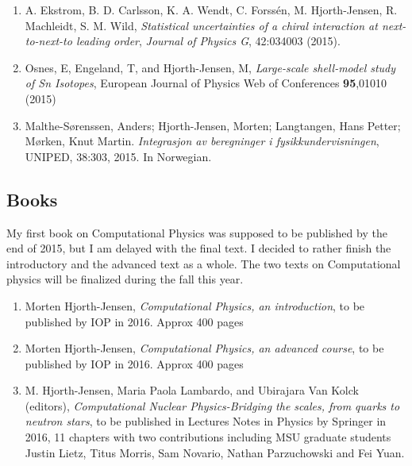\documentclass[prc,amsart,english,twocolumn,superscriptaddress,showpacs,floatfix]{revtex4}
\begin{document}
\begin{enumerate}
\item A. Ekstrom, B. D. Carlsson, K. A. Wendt, C. Forssén, M. Hjorth-Jensen, R. Machleidt, S. M. Wild,  \emph{Statistical uncertainties of a chiral interaction at next-to-next-to leading order},   \emph{Journal of Physics G}, 42:034003 (2015).



\item Osnes, E, Engeland, T, and Hjorth-Jensen, M, \emph{Large-scale shell-model study of Sn Isotopes}, European Journal of Physics Web of Conferences \textbf{95},01010 (2015)

\item Malthe-S\o renssen, Anders; Hjorth-Jensen, Morten; Langtangen, Hans Petter; M\o rken, Knut Martin. \emph{Integrasjon av beregninger i fysikkundervisningen}, UNIPED, 38:303, 2015. In Norwegian.
 \end{enumerate}


 \subsection*{Books}
My first book on Computational Physics was supposed to be published by the end of 2015, but I am delayed with the final text. I decided to rather finish the introductory and the advanced text as a whole. The two texts on Computational physics will be finalized during the fall this year. 
\begin{enumerate}
\item Morten Hjorth-Jensen, \emph{Computational Physics, an introduction}, to be published by IOP in 2016. Approx 400 pages

\item Morten Hjorth-Jensen, \emph{Computational Physics, an advanced course}, to be published by IOP in 2016. Approx 400 pages


\item M. Hjorth-Jensen, Maria Paola Lambardo, and Ubirajara Van Kolck (editors), \emph{Computational Nuclear Physics-Bridging the scales, from quarks to neutron stars}, to be published in Lectures Notes in Physics by Springer in 2016, 11 chapters with two contributions including MSU graduate students Justin Lietz, Titus Morris, Sam Novario, Nathan Parzuchowski and Fei Yuan. 
\end{enumerate}
\end{document}
